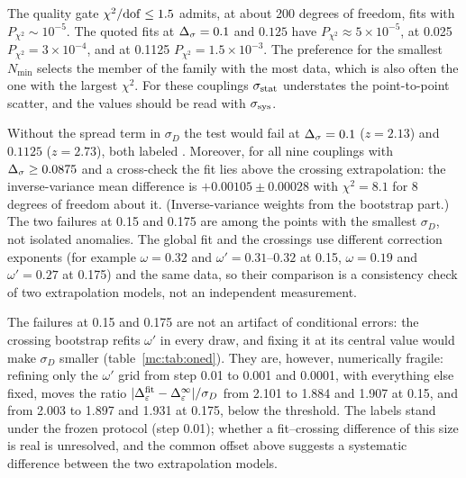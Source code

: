 \begin{description}[leftmargin=1.2em]
\item[Goodness of fit.] The quality gate $\chi^2/{\rm dof}\le1.5$ admits, at about 200 degrees of freedom, fits with $P_{\chi^2}\sim10^{-5}$.
 The quoted fits at $\Delta_\sigma=0.1$ and $0.125$ have $P_{\chi^2}\approx5\times10^{-5}$, at 0.025 $P_{\chi^2}=3\times10^{-4}$, and at 0.1125
 $P_{\chi^2}=1.5\times10^{-3}$. The preference for the smallest $N_{\min}$
 selects the member of the family with the most data, which is also often the one with the largest $\chi^2$. For these couplings $\sigma_{\rm stat}$
 understates the point-to-point scatter, and the values should be read with $\sigma_{\rm sys}$.
\item[The cross-check and its $\sigma_D$.] Without the spread term in $\sigma_D$ the test would fail at $\Delta_\sigma=0.1$ ($z=2.13$) and $0.1125$
 ($z=2.73$), both labeled . Moreover, for all nine couplings with $\Delta_\sigma\ge0.0875$ and a cross-check the fit lies above the
 crossing extrapolation: the inverse-variance mean difference is $+0.00105\pm0.00028$ with $\chi^2=8.1$ for 8 degrees of freedom about it. (Inverse-variance weights from the
 bootstrap part.) The two failures at 0.15 and 0.175 are among the points with the smallest $\sigma_D$, not isolated anomalies. The global fit and the crossings use
 different correction exponents (for example $\omega=0.32$ and $\omega'=0.31$--$0.32$ at 0.15, $\omega=0.19$ and $\omega'=0.27$ at 0.175) and the
 same data, so their comparison is a consistency check of two extrapolation models, not an independent measurement.
\item[The failures and the $\omega'$ grid.] The failures at 0.15 and 0.175 are not an artifact of conditional errors: the crossing bootstrap
 refits $\omega'$ in every draw, and fixing it at its central value would make $\sigma_D$ smaller (table~\ref{mc:tab:oned}). They are, however, numerically fragile:
 refining only the $\omega'$ grid from step 0.01 to 0.001 and 0.0001, with everything else fixed, moves the ratio
 $|\Delta_\varepsilon^{\rm fit}-\Delta_\varepsilon^\infty|/\sigma_D$ from 2.101 to 1.884 and 1.907 at 0.15, and from 2.003 to 1.897 and 1.931 at 0.175, below the
 threshold. The labels stand under the frozen protocol (step 0.01); whether a fit--crossing difference of this size is real is unresolved, and
 the common offset above suggests a systematic difference between the two extrapolation models.
\begin{table}[htbp]\centering\scriptsize
\caption{The cross-check at $\Ds=0.15,0.175$ with $\omega'$ refitted per draw (as recorded) and fixed at its central value. Last column:
}
\end{table}
\end{description}
